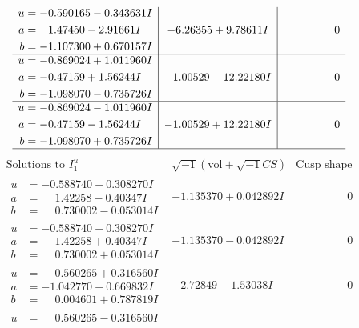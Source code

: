 \documentclass[1p]{elsarticle_modified}
\theoremstyle{definition}
\newcommand{\I}{\sqrt{-1}}
\begin{document}
$$\begin{array}{c|c|c}
\begin{aligned}
u &= -0.590165 - 0.343631 I \\
a &= \phantom{-}1.47450 - 2.91661 I \\
b &= -1.107300 + 0.670157 I\end{aligned}
 & -6.26355 + 9.78611 I & \phantom{-0.000000 } 0 \\ \hline\begin{aligned}
u &= -0.869024 + 1.011960 I \\
a &= -0.47159 + 1.56244 I \\
b &= -1.098070 - 0.735726 I\end{aligned}
 & -1.00529 - 12.22180 I & \phantom{-0.000000 } 0 \\ \hline\begin{aligned}
u &= -0.869024 - 1.011960 I \\
a &= -0.47159 - 1.56244 I \\
b &= -1.098070 + 0.735726 I\end{aligned}
 & -1.00529 + 12.22180 I & \phantom{-0.000000 } 0\\
 \hline 
 \end{array}$$\newpage$$\begin{array}{c|c|c}  
\text{Solutions to }I^u_{1}& \I (\text{vol} + \sqrt{-1}CS) & \text{Cusp shape}\\
 \hline 
\begin{aligned}
u &= -0.588740 + 0.308270 I \\
a &= \phantom{-}1.42258 - 0.40347 I \\
b &= \phantom{-}0.730002 - 0.053014 I\end{aligned}
 & -1.135370 + 0.042892 I & \phantom{-0.000000 } 0 \\ \hline\begin{aligned}
u &= -0.588740 - 0.308270 I \\
a &= \phantom{-}1.42258 + 0.40347 I \\
b &= \phantom{-}0.730002 + 0.053014 I\end{aligned}
 & -1.135370 - 0.042892 I & \phantom{-0.000000 } 0 \\ \hline\begin{aligned}
u &= \phantom{-}0.560265 + 0.316560 I \\
a &= -1.042770 - 0.669832 I \\
b &= \phantom{-}0.004601 + 0.787819 I\end{aligned}
 & -2.72849 + 1.53038 I & \phantom{-0.000000 } 0 \\ \hline\begin{aligned}
u &= \phantom{-}0.560265 - 0.316560 I \\

\end{aligned}
\end{array}$$
\end{document}
